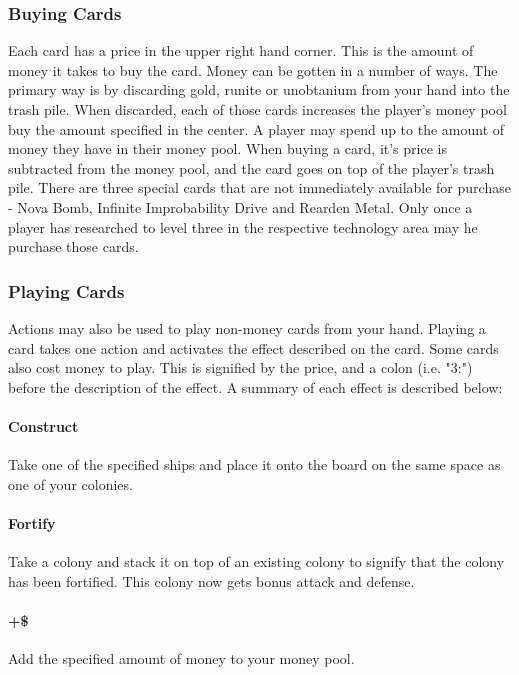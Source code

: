 \documentclass[12pt]{article} %
\begin{document}
\subsubsection{Buying Cards}

Each card has a price in the upper right hand corner.  This is the amount of money it takes to buy the card.  Money can be gotten in a number of ways.  The primary way is by discarding gold, runite or unobtanium from your hand into the trash pile.  When discarded, each of those cards increases the player's money pool buy the amount specified in the center.  A player may spend up to the amount of money they have in their money pool.  When buying a card, it's price is subtracted from the money pool, and the card goes on top of the player's trash pile.  There are three special cards that are not immediately available for purchase - Nova Bomb, Infinite Improbability Drive and Rearden Metal.  Only once a player has researched to level three in the respective technology area may he purchase those cards.

\subsubsection{Playing Cards}

Actions may also be used to play non-money cards from your hand.  Playing a card takes one action and activates the effect described on the card.  Some cards also cost money to play.  This is signified by the price, and a colon (i.e. "3:") before the description of the effect.  A summary of each effect is described below:

\paragraph{Construct}
Take one of the specified ships and place it onto the board on the same space as one of your colonies.

\paragraph{Fortify}
Take a colony and stack it on top of an existing colony to signify that the colony has been fortified.  This colony now gets bonus attack and defense.

\paragraph{+\$}
Add the specified amount of money to your money pool.
\end{document}
